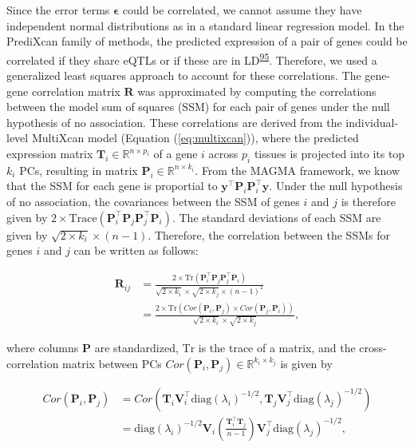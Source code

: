 \documentclass[
  a4paper,
]{article}
\newcommand{\bm}[1]{\boldsymbol{#1}}
\begin{document}
Since the error terms \(\bm{\epsilon}\) could be correlated, we cannot assume they have independent normal distributions as in a standard linear regression model.
In the PrediXcan family of methods, the predicted expression of a pair of genes could be correlated if they share eQTLs or if these are in LD\textsuperscript{\protect\hyperlink{ref-l6ogswV3}{95}}.
Therefore, we used a generalized least squares approach to account for these correlations.
The gene-gene correlation matrix \(\mathbf{R}\) was approximated by computing the correlations between the model sum of squares (SSM) for each pair of genes under the null hypothesis of no association.
These correlations are derived from the individual-level MultiXcan model (Equation (\ref{eq:multixcan})), where the predicted expression matrix \(\mathbf{T}_{i} \in \mathbb{R}^{n \times p_i}\) of a gene \(i\) across \(p_i\) tissues is projected into its top \(k_i\) PCs, resulting in matrix \(\mathbf{P}_{i} \in \mathbb{R}^{n \times k_i}\).
From the MAGMA framework, we know that the SSM for each gene is proportial to \(\mathbf{y}^{\top} \mathbf{P}_{i} \mathbf{P}_{i}^{\top} \mathbf{y}\).
Under the null hypothesis of no association, the covariances between the SSM of genes \(i\) and \(j\) is therefore given by \(2 \times \mathrm{Trace}(\mathbf{P}_{i}^{\top} \mathbf{P}_{j} \mathbf{P}_{j}^{\top} \mathbf{P}_{i})\).
The standard deviations of each SSM are given by \(\sqrt{2 \times k_{i}} \times (n - 1)\).
Therefore, the correlation between the SSMs for genes \(i\) and \(j\) can be written as follows:

\begin{equation}
\begin{split}
\mathbf{R}_{ij} & = \frac{2 \times \mathrm{Tr}(\mathbf{P}_{i}^{\top} \mathbf{P}_{j} \mathbf{P}_{j}^{\top} \mathbf{P}_{i})}{\sqrt{2 \times k_{i}} \times \sqrt{2 \times k_{j}} \times (n - 1)^2} \\
& = \frac{2 \times \mathrm{Tr}(Cor(\mathbf{P}_{i}, \mathbf{P}_{j}) \times Cor(\mathbf{P}_{j}, \mathbf{P}_{i}))}{\sqrt{2 \times k_{i}} \times \sqrt{2 \times k_{j}}},
\end{split}
\label{eq:reg:r}\end{equation}

where columns \(\mathbf{P}\) are standardized,
\(\mathrm{Tr}\) is the trace of a matrix,
and the cross-correlation matrix between PCs \(Cor(\mathbf{P}_{i}, \mathbf{P}_{j}) \in \mathbb{R}^{k_i \times k_j}\) is given by

\begin{equation}
\begin{split}
Cor(\mathbf{P}_{i}, \mathbf{P}_{j}) & = Cor(\mathbf{T}_{i} \mathbf{V}_{i}^{\top} \mathrm{diag}(\lambda_i)^{-1/2}, \mathbf{T}_{j} \mathbf{V}_{j}^{\top} \mathrm{diag}(\lambda_j)^{-1/2}) \\
& = \mathrm{diag}(\lambda_i)^{-1/2} \mathbf{V}_{i} (\frac{\mathbf{T}_{i}^{\top} \mathbf{T}_{j}}{n-1}) \mathbf{V}_{j}^{\top} \mathrm{diag}(\lambda_j)^{-1/2},
\end{split}
\label{eq:reg:cor_pp}\end{equation}
\end{document}
